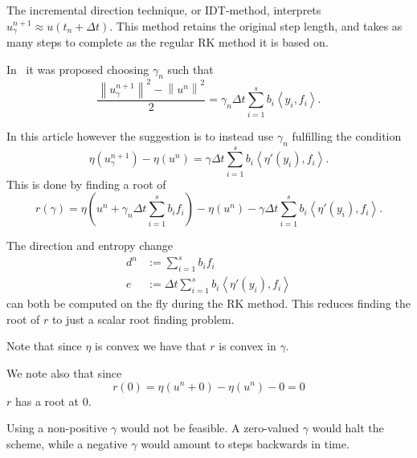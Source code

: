 \documentclass{article}
\newcommand{\norm}[1]{\left\lVert#1\right\rVert}
\newcommand{\inner}[2]{\left< #1 , #2 \right>}
\begin{document}
    \vspace*{5mm}
    The incremental direction technique, or IDT-method, interprets \(u_{\gamma}^{n+1} \approx u(t_n + \Delta t)\). This method retains the original step length, and takes as many steps to complete as the regular RK method it is based on.

    \vspace*{5mm}
    In~\cite{ketcheson2019relaxation} it was proposed choosing \(\gamma_n\) such that
    \[ \frac{\norm{u^{n+1}_{\gamma}}^2 - \norm{u^{n}}^2}{2} = \gamma_n \Delta t \sum_{i=1}^{s} b_i \inner{y_i}{f_i} .\]

    In this article however the suggestion is to instead use \(\gamma_n\) fulfilling the condition
    \[  \eta (u^{n+1}_{\gamma}) - \eta (u^{n}) = \gamma \Delta t \sum_{i=1}^{s} b_i \inner{\eta'(y_i)}{f_i}.\]
    This is done by finding a root of
    \begin{equation}\label{Eq_r}
        r(\gamma) = \eta (u^{n} + \gamma_n \Delta t \sum_{i=1}^{s} b_i f_i) - \eta (u^{n}) - \gamma \Delta t \sum_{i=1}^{s} b_i \inner{\eta'(y_i)}{f_i}.
    \end{equation}

    The direction and entropy change
    \begin{align*}
        d^n &:= \sum^s_{i=1}b_if_i \\
        e   &:= \Delta t \sum^s_{i=1} b_i \inner{\eta'(y_i)}{f_i}
    \end{align*}
    can both be computed on the fly during the RK method. This reduces finding the root of \(r\) to just a scalar root finding problem.

    Note that since \(\eta\) is convex we have that \(r\) is convex in \(\gamma\).

    We note also that since
    \begin{equation}\label{Eq_r_at_0}
        r(0) = \eta (u^{n} + 0) - \eta (u^{n}) - 0 = 0
    \end{equation}
    \(r\) has a root at \(0\).

    Using a non-positive \(\gamma\) would not be feasible. A zero-valued \(\gamma\) would halt the scheme, while a negative \(\gamma\) would amount to steps backwards in time.

%

%
\end{document}
